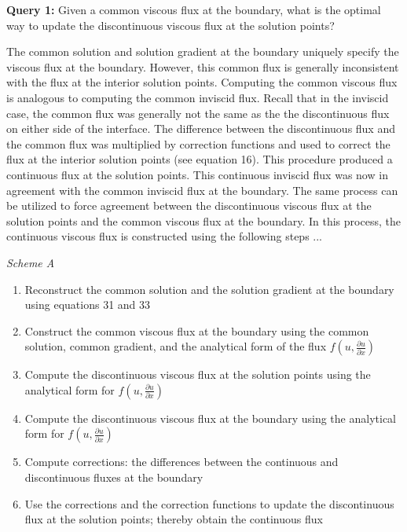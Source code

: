 \vspace{0.2in}
\begin{raggedleft}
{\bf Query 1:} Given a common viscous flux at the boundary, what is the optimal way to update the discontinuous viscous flux at the solution points?
\end{raggedleft}
\vspace{0.2 in}

The common solution and solution gradient at the boundary uniquely specify the viscous flux at the boundary. However, this common flux is generally inconsistent with the flux at the interior solution points. Computing the common viscous flux is analogous to computing the common inviscid flux. Recall that in the inviscid case, the common flux was generally not the same as the the discontinuous flux on either side of the interface. The difference between the discontinuous flux and the common flux was multiplied by correction functions and used to correct the flux at the interior solution points (see equation 16). This procedure produced a continuous flux at the solution points. This continuous inviscid flux was now in agreement with the common inviscid flux at the boundary. The same process can be utilized to force agreement between the discontinuous viscous flux at the solution points and the common viscous flux at the boundary. In this process, the continuous viscous flux is constructed using the following steps ...

\vspace{0.1 in}
\noindent \emph{Scheme A}  	
\vspace{0.1 in}

\begin{enumerate}
\item Reconstruct the common solution and the solution gradient at the boundary using equations 31 and 33
\item Construct the common viscous flux at the boundary using the common solution, common gradient, and the analytical form of the flux $f(u, \frac {\partial u}{\partial x})$
\item Compute the discontinuous viscous flux at the solution points using the analytical form for $f(u, \frac {\partial u}{\partial x})$
\item Compute the discontinuous viscous flux at the boundary using the analytical form for $f(u, \frac {\partial u}{\partial x})$
\item Compute corrections: the differences between the continuous and discontinuous fluxes at the boundary
\item Use the corrections and the correction functions to update the discontinuous flux at the solution points; thereby obtain the continuous flux
\end{enumerate}

